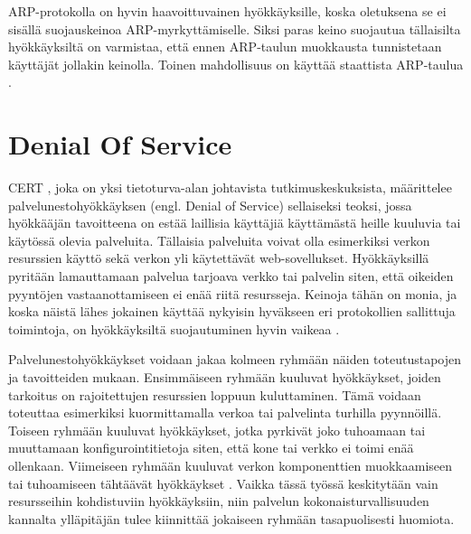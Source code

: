 ARP-protokolla on hyvin haavoittuvainen hyökkäyksille, koska oletuksena se ei
sisällä suojauskeinoa ARP-myrkyttämiselle. Siksi paras keino suojautua
tällaisilta hyökkäyksiltä on varmistaa, että ennen ARP-taulun muokkausta
tunnistetaan käyttäjät jollakin keinolla. Toinen mahdollisuus on käyttää
staattista ARP-taulua \cite{WEBS}.

\section{Denial Of Service}

CERT \cite{CERT}, joka on yksi tietoturva-alan johtavista tutkimuskeskuksista, 
määrittelee palvelunestohyökkäyksen (engl. Denial of Service)
sellaiseksi teoksi, jossa hyökkääjän tavoitteena on estää laillisia
käyttäjiä käyttämästä heille kuuluvia tai käytössä olevia
palveluita. Tällaisia palveluita voivat olla esimerkiksi verkon
resurssien käyttö sekä verkon yli käytettävät
web-sovellukset. Hyökkäyksillä pyritään lamauttamaan palvelua tarjoava
verkko tai palvelin siten, että oikeiden pyyntöjen vastaanottamiseen
ei enää riitä resursseja. Keinoja tähän on monia, ja koska näistä
lähes jokainen käyttää nykyisin hyväkseen eri protokollien sallittuja
toimintoja, on hyökkäyksiltä suojautuminen hyvin vaikeaa \cite{Hacking}.

Palvelunestohyökkäykset voidaan jakaa kolmeen ryhmään näiden
toteutustapojen ja tavoitteiden mukaan. Ensimmäiseen ryhmään kuuluvat
hyökkäykset, joiden tarkoitus on rajoitettujen resurssien loppuun
kuluttaminen. Tämä voidaan toteuttaa esimerkiksi kuormittamalla verkoa
tai palvelinta turhilla pyynnöillä. Toiseen ryhmään kuuluvat
hyökkäykset, jotka pyrkivät joko tuhoamaan tai muuttamaan
konfigurointitietoja siten, että kone tai verkko ei toimi enää
ollenkaan. Viimeiseen ryhmään kuuluvat verkon komponenttien
muokkaamiseen tai tuhoamiseen tähtäävät hyökkäykset \cite{CERT}. Vaikka tässä
työssä keskitytään vain resursseihin kohdistuviin hyökkäyksiin, niin
palvelun kokonaisturvallisuuden kannalta ylläpitäjän tulee kiinnittää 
jokaiseen ryhmään tasapuolisesti huomiota.

